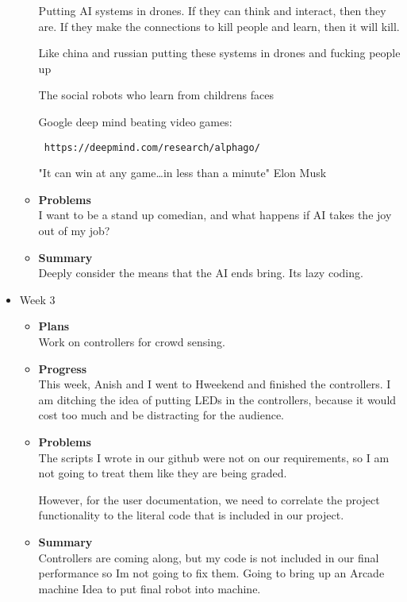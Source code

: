 \begin{itemize}
\begin{itemize}
					 

					Putting AI systems in drones. If they can think and interact, then they are. If they make the connections to kill people and learn, then it will kill. 

					Like china and russian putting these systems in drones and fucking people up 

					The social robots who learn from childrens faces 					 

					Google deep mind beating video games:\begin{verbatim} https://deepmind.com/research/alphago/ \end{verbatim}
"It can win at any game…in less than a minute" Elon Musk 

					 
				\item \textbf{Problems} \\
					I want to be a stand up comedian, and what happens if AI takes the joy out of my job?
				\item \textbf{Summary} \\
					Deeply consider the means that the AI ends bring. Its lazy coding.
			\end{itemize}

		\item{Week 3}
			\begin{itemize}
				\item \textbf{Plans} \\
					Work on controllers for crowd sensing.
				\item \textbf{Progress} \\
This week, Anish and I went to Hweekend and finished the controllers. I am ditching the idea of putting LEDs in the controllers, because it would cost too much and be distracting for the audience. 
				\item \textbf{Problems} \\

					The scripts I wrote in our github were not on our requirements, so I am not going to treat them like they are being graded. 

					 

					However, for the user documentation, we need to correlate the project functionality to the literal code that is included in our project. 
				\item \textbf{Summary} \\
					Controllers are coming along, but my code is not included in our final performance so Im not going to fix them.
					Going to bring up an Arcade machine Idea to put final robot into machine.
			\end{itemize}


\end{itemize}

